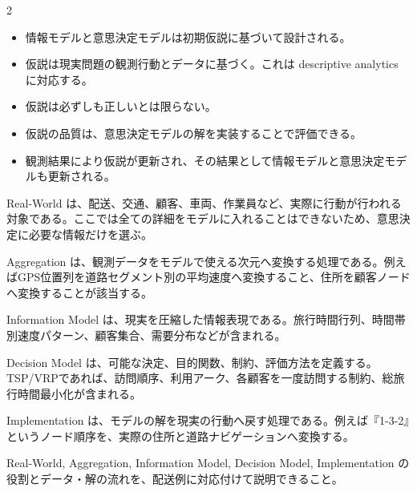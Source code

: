\begin{multicols}{2}

\footnotesize

\raggedcolumns


\begin{itemize}
\item 情報モデルと意思決定モデルは初期仮説に基づいて設計される。
\item 仮説は現実問題の観測行動とデータに基づく。これは descriptive analytics に対応する。
\item 仮説は必ずしも正しいとは限らない。
\item 仮説の品質は、意思決定モデルの解を実装することで評価できる。
\item 観測結果により仮説が更新され、その結果として情報モデルと意思決定モデルも更新される。
\end{itemize}

Real-World は、配送、交通、顧客、車両、作業員など、実際に行動が行われる対象である。ここでは全ての詳細をモデルに入れることはできないため、意思決定に必要な情報だけを選ぶ。\par

Aggregation は、観測データをモデルで使える次元へ変換する処理である。例えばGPS位置列を道路セグメント別の平均速度へ変換すること、住所を顧客ノードへ変換することが該当する。\par

Information Model は、現実を圧縮した情報表現である。旅行時間行列、時間帯別速度パターン、顧客集合、需要分布などが含まれる。\par

Decision Model は、可能な決定、目的関数、制約、評価方法を定義する。TSP/VRPであれば、訪問順序、利用アーク、各顧客を一度訪問する制約、総旅行時間最小化が含まれる。\par

Implementation は、モデルの解を現実の行動へ戻す処理である。例えば『1-3-2』というノード順序を、実際の住所と道路ナビゲーションへ変換する。\par

Real-World, Aggregation, Information Model, Decision Model, Implementation の役割とデータ・解の流れを、配送例に対応付けて説明できること。\par


\end{multicols}
